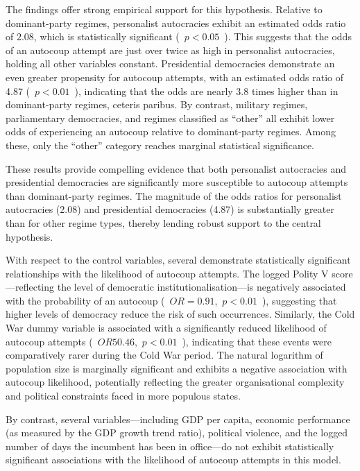 \documentclass[
  12pt,
]{report}
\begin{document}
\begin{table}
{}

\end{table}%

The findings offer strong empirical support for this hypothesis.
Relative to dominant-party regimes, personalist autocracies exhibit an
estimated odds ratio of 2.08, which is statistically significant (\,
\(p<0.05\) \,). This suggests that the odds of an autocoup attempt are
just over twice as high in personalist autocracies, holding all other
variables constant. Presidential democracies demonstrate an even greater
propensity for autocoup attempts, with an estimated odds ratio of 4.87 (
\,\(p<0.01\) \,), indicating that the odds are nearly 3.8 times higher
than in dominant-party regimes, ceteris paribus. By contrast, military
regimes, parliamentary democracies, and regimes classified as ``other''
all exhibit lower odds of experiencing an autocoup relative to
dominant-party regimes. Among these, only the ``other'' category reaches
marginal statistical significance.

These results provide compelling evidence that both personalist
autocracies and presidential democracies are significantly more
susceptible to autocoup attempts than dominant-party regimes. The
magnitude of the odds ratios for personalist autocracies (2.08) and
presidential democracies (4.87) is substantially greater than for other
regime types, thereby lending robust support to the central hypothesis.

With respect to the control variables, several demonstrate statistically
significant relationships with the likelihood of autocoup attempts. The
logged Polity V score---reflecting the level of democratic
institutionalisation---is negatively associated with the probability of
an autocoup (\, \(OR = 0.91\), \,\(p<0.01\) \,), suggesting that higher
levels of democracy reduce the risk of such occurrences. Similarly, the
Cold War dummy variable is associated with a significantly reduced
likelihood of autocoup attempts ( \,\(OR 5 0.46\), \,\(p<0.01\) \,),
indicating that these events were comparatively rarer during the Cold
War period. The natural logarithm of population size is marginally
significant and exhibits a negative association with autocoup
likelihood, potentially reflecting the greater organisational complexity
and political constraints faced in more populous states.

By contrast, several variables---including GDP per capita, economic
performance (as measured by the GDP growth trend ratio), political
violence, and the logged number of days the incumbent has been in
office---do not exhibit statistically significant associations with the
likelihood of autocoup attempts in this model.
\end{document}
